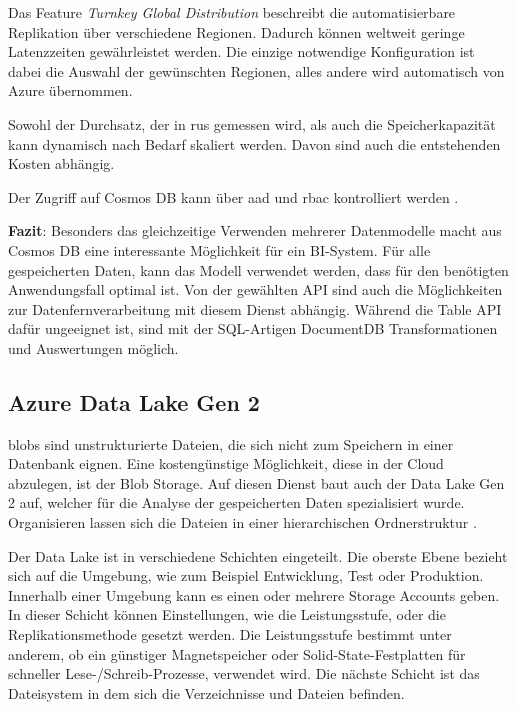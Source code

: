 Das Feature \textit{Turnkey Global Distribution} beschreibt die automatisierbare Replikation über verschiedene Regionen. Dadurch können weltweit geringe Latenzzeiten gewährleistet werden. Die einzige notwendige Konfiguration ist dabei die Auswahl der gewünschten Regionen, alles andere wird automatisch von Azure übernommen.

Sowohl der Durchsatz, der in \acp{ru} gemessen wird, als auch die Speicherkapazität kann dynamisch nach Bedarf skaliert werden. Davon sind auch die entstehenden Kosten abhängig.
\cite{guay_paz_microsoft_2018}\cite{mrzyglod_hands-azure_2018}

Der Zugriff auf Cosmos DB kann über \ac{aad} und \ac{rbac} kontrolliert werden \cite{weiss_azure_2021}.

\textbf{Fazit}: Besonders das gleichzeitige Verwenden mehrerer Datenmodelle macht aus Cosmos DB eine interessante Möglichkeit für ein BI-System. Für alle gespeicherten Daten, kann das Modell verwendet werden, dass für den benötigten Anwendungsfall optimal ist. Von der gewählten API sind auch die Möglichkeiten zur Datenfernverarbeitung mit diesem Dienst abhängig. Während die Table API dafür ungeeignet ist, sind mit der SQL-Artigen DocumentDB Transformationen und Auswertungen möglich.

\subsection{Azure Data Lake Gen 2} \label{sec:grundlagen:azure_dienste:dataLake}
\acp{blob} sind unstrukturierte Dateien, die sich nicht zum Speichern in einer Datenbank eignen. Eine kostengünstige Möglichkeit, diese in der Cloud abzulegen, ist der Blob Storage. Auf diesen Dienst baut auch der Data Lake Gen 2 auf, welcher für die Analyse der gespeicherten Daten spezialisiert wurde. Organisieren lassen sich die Dateien in einer hierarchischen Ordnerstruktur \cite{soh_microsoft_2020}.

Der Data Lake ist in verschiedene Schichten eingeteilt. Die oberste Ebene bezieht sich auf die Umgebung, wie zum Beispiel Entwicklung, Test oder Produktion. Innerhalb einer Umgebung kann es einen oder mehrere Storage Accounts geben. In dieser Schicht können Einstellungen, wie die Leistungsstufe, oder die Replikationsmethode gesetzt werden. Die Leistungsstufe bestimmt unter anderem, ob ein günstiger Magnetspeicher oder Solid-State-Festplatten für schneller Lese-/Schreib-Prozesse, verwendet wird. Die nächste Schicht ist das Dateisystem in dem sich die Verzeichnisse und Dateien befinden.

